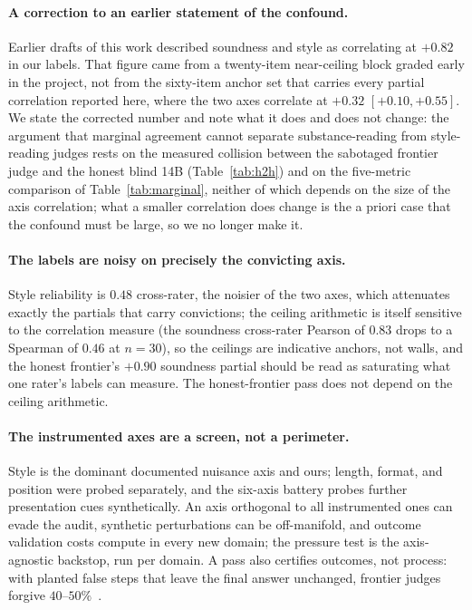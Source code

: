 \documentclass[11pt]{article}
\begin{document}
\paragraph{A correction to an earlier statement of the confound.}
Earlier drafts of this work described soundness and style as correlating at $+0.82$ in our labels.
That figure came from a twenty-item near-ceiling block graded early in the project, not from the sixty-item anchor set that carries every partial correlation reported here, where the two axes correlate at $+0.32$ $[+0.10, +0.55]$.
We state the corrected number and note what it does and does not change: the argument that marginal agreement cannot separate substance-reading from style-reading judges rests on the measured collision between the sabotaged frontier judge and the honest blind 14B (Table~\ref{tab:h2h}) and on the five-metric comparison of Table~\ref{tab:marginal}, neither of which depends on the size of the axis correlation; what a smaller correlation does change is the a priori case that the confound must be large, so we no longer make it.

\paragraph{The labels are noisy on precisely the convicting axis.}
Style reliability is $0.48$ cross-rater, the noisier of the two axes, which attenuates exactly the partials that carry convictions; the ceiling arithmetic is itself sensitive to the correlation measure (the soundness cross-rater Pearson of $0.83$ drops to a Spearman of $0.46$ at $n{=}30$), so the ceilings are indicative anchors, not walls, and the honest frontier's $+0.90$ soundness partial should be read as saturating what one rater's labels can measure.
The honest-frontier pass does not depend on the ceiling arithmetic.

\paragraph{The instrumented axes are a screen, not a perimeter.}
Style is the dominant documented nuisance axis and ours; length, format, and position were probed separately, and the six-axis battery probes further presentation cues synthetically.
An axis orthogonal to all instrumented ones can evade the audit, synthetic perturbations can be off-manifold, and outcome validation costs compute in every new domain; the pressure test is the axis-agnostic backstop, run per domain.
A pass also certifies outcomes, not process: with planted false steps that leave the final answer unchanged, frontier judges forgive $40$--$50\%$~\cite{companionB}.
\end{document}
